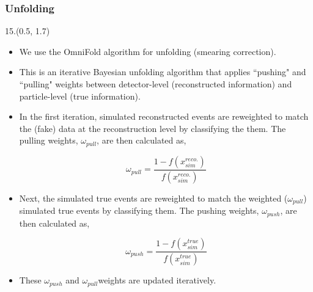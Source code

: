 \documentclass[10pt, xcolor={dvipsnames}, sans, mathserif, aspectratio=169]{beamer}
\newenvironment{List}[2]
{\begin{textblock}{#1}#2
\begin{itemize}}
{\end{itemize}
\end{textblock}}
\newcommand{\citeslide}[1]{{\tiny \footfullcite{#1}}}
\begin{document}
\begin{frame}
\frametitle{Unfolding}

\begin{List}{15.}{(0.5, 1.7)}

	\item We use the OmniFold\citeslide{Andreassen:2021zzk} algorithm for unfolding (smearing correction).
	
	\item This is an iterative Bayesian unfolding algorithm that applies ``pushing" and ``pulling" weights between detector-level (reconstructed information) and particle-level (true information).
	
	\item In the first iteration, simulated reconstructed events are reweighted to match the (fake) data at the reconstruction level by classifying the them. The pulling weights, $\omega_{pull}$, are then calculated as,
	
	\begin{equation*}
		\omega_{pull} = \dfrac{1 - f(x_{sim}^{reco.})}{f(x_{sim}^{reco.})}
	\end{equation*}
	
	\item Next, the simulated true events are reweighted to match the weighted ($\omega_{pull}$) simulated true events by classifying them. The pushing weights, $\omega_{push}$, are then calculated as,
	
	\begin{equation*}
		\omega_{push} = \dfrac{1 - f(x_{sim}^{true})}{f(x_{sim}^{true})}
	\end{equation*}
	
	\item These $\omega_{push}$ and $\omega_{pull}$​ weights are updated iteratively.
	
\end{List}
\end{frame}
\end{document}
